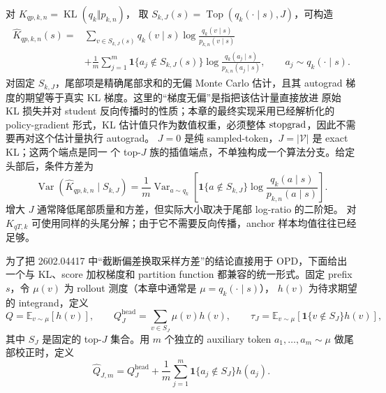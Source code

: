 对 $K_{qp,k,n}=\operatorname{KL}(q_k\Vert p_{k,n})$， 取 $S_{k,J}(s)=\operatorname{Top}(q_k(\cdot\mid s),J)$，可构造
\begin{align}
\widehat K_{qp,k,n}(s)
={}&\sum_{v\in S_{k,J}(s)}q_k(v\mid s)
\log\frac{q_k(v\mid s)}{p_{k,n}(v\mid s)}\\
&+\frac1m\sum_{j=1}^{m}\mathbf 1\{a_j\notin S_{k,J}(s)\}
\log\frac{q_k(a_j\mid s)}{p_{k,n}(a_j\mid s)},
\qquad a_j\sim q_k(\cdot\mid s).
\label{eq:ch2-opd-topk-anchor-kl}
\end{align}
对固定 $S_{k,J}$，尾部项是精确尾部求和的无偏 Monte Carlo 估计，且其 autograd 梯度的期望等于真实 KL 梯度。这里的“梯度无偏”是指把该估计量直接放进 原始 KL 损失并对 student 反向传播时的性质；本章的最终实现采用已经解析化的 policy-gradient 形式，KL 估计值只作为数值权重，必须整体 $\operatorname{stopgrad}$，因此不需要再对这个估计量执行 autograd。 $J=0$ 是纯 sampled-token，$J=|\mathcal V|$ 是 exact KL；这两个端点是同一 个 top-$J$ 族的插值端点，不单独构成一个算法分支。给定头部后，条件方差为
\begin{equation}
\operatorname{Var}(\widehat K_{qp,k,n}\mid S_{k,J})
=\frac1m\operatorname{Var}_{a\sim q_k}\left[
\mathbf 1\{a\notin S_{k,J}\}
\log\frac{q_k(a\mid s)}{p_{k,n}(a\mid s)}\right].
\end{equation}
增大 $J$ 通常降低尾部质量和方差，但实际大小取决于尾部 log-ratio 的二阶矩。 对 $K_{qT,k}$ 可使用同样的头尾分解；由于它不需要反向传播，anchor 样本均值往往已经足够。

为了把 2602.04417 中“截断偏差换取采样方差”的结论直接用于 OPD，下面给出 一个与 KL、score 加权梯度和 partition function 都兼容的统一形式。固定 prefix $s$，令 $\mu(v)$ 为 rollout 测度（本章中通常是 $\mu=q_k(\cdot\mid s)$）， $h(v)$ 为待求期望的 integrand，定义
\begin{equation}
Q=\mathbb E_{v\sim\mu}[h(v)],\qquad
Q_J^{\mathrm{head}}=\sum_{v\in S_J}\mu(v)h(v),\qquad
\tau_J=\mathbb E_{v\sim\mu}[\mathbf 1\{v\notin S_J\}h(v)],
\label{eq:ch2-opd-generic-tail}
\end{equation}
其中 $S_J$ 是固定的 top-$J$ 集合。用 $m$ 个独立的 auxiliary token $a_1,\ldots,a_m\sim\mu$ 做尾部校正时，定义
\begin{equation}
\widehat Q_{J,m}=Q_J^{\mathrm{head}}+
\frac1m\sum_{j=1}^{m}\mathbf 1\{a_j\notin S_J\}h(a_j).
\label{eq:ch2-opd-generic-topk}
\end{equation}

